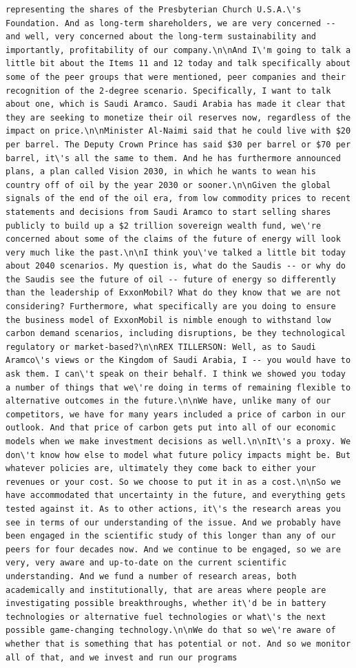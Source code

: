 \documentclass[
  letterpaper,
  DIV=11,
  numbers=noendperiod]{scrreprt}
\begin{document}
\begin{verbatim}
representing the shares of the Presbyterian Church U.S.A.\'s Foundation. And as long-term shareholders, we are very concerned -- and well, very concerned about the long-term sustainability and importantly, profitability of our company.\n\nAnd I\'m going to talk a little bit about the Items 11 and 12 today and talk specifically about some of the peer groups that were mentioned, peer companies and their recognition of the 2-degree scenario. Specifically, I want to talk about one, which is Saudi Aramco. Saudi Arabia has made it clear that they are seeking to monetize their oil reserves now, regardless of the impact on price.\n\nMinister Al-Naimi said that he could live with $20 per barrel. The Deputy Crown Prince has said $30 per barrel or $70 per barrel, it\'s all the same to them. And he has furthermore announced plans, a plan called Vision 2030, in which he wants to wean his country off of oil by the year 2030 or sooner.\n\nGiven the global signals of the end of the oil era, from low commodity prices to recent statements and decisions from Saudi Aramco to start selling shares publicly to build up a $2 trillion sovereign wealth fund, we\'re concerned about some of the claims of the future of energy will look very much like the past.\n\nI think you\'ve talked a little bit today about 2040 scenarios. My question is, what do the Saudis -- or why do the Saudis see the future of oil -- future of energy so differently than the leadership of ExxonMobil? What do they know that we are not considering? Furthermore, what specifically are you doing to ensure the business model of ExxonMobil is nimble enough to withstand low carbon demand scenarios, including disruptions, be they technological regulatory or market-based?\n\nREX TILLERSON: Well, as to Saudi Aramco\'s views or the Kingdom of Saudi Arabia, I -- you would have to ask them. I can\'t speak on their behalf. I think we showed you today a number of things that we\'re doing in terms of remaining flexible to alternative outcomes in the future.\n\nWe have, unlike many of our competitors, we have for many years included a price of carbon in our outlook. And that price of carbon gets put into all of our economic models when we make investment decisions as well.\n\nIt\'s a proxy. We don\'t know how else to model what future policy impacts might be. But whatever policies are, ultimately they come back to either your revenues or your cost. So we choose to put it in as a cost.\n\nSo we have accommodated that uncertainty in the future, and everything gets tested against it. As to other actions, it\'s the research areas you see in terms of our understanding of the issue. And we probably have been engaged in the scientific study of this longer than any of our peers for four decades now. And we continue to be engaged, so we are very, very aware and up-to-date on the current scientific understanding. And we fund a number of research areas, both academically and institutionally, that are areas where people are investigating possible breakthroughs, whether it\'d be in battery technologies or alternative fuel technologies or what\'s the next possible game-changing technology.\n\nWe do that so we\'re aware of whether that is something that has potential or not. And so we monitor all of that, and we invest and run our programs 
\end{verbatim}
\end{document}
